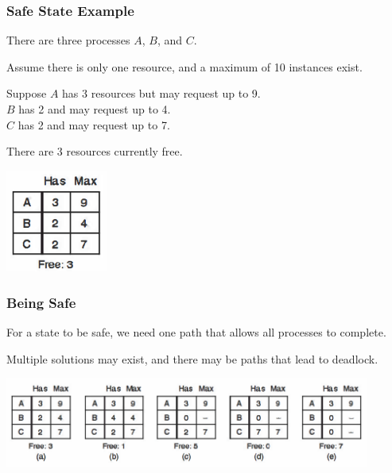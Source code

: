 \begin{frame}
\frametitle{Safe State Example}

There are three processes $A$, $B$, and $C$. 

Assume there is only one resource, and a maximum of 10 instances exist. 

Suppose $A$ has 3 resources but may request up to 9.\\
$B$ has 2 and may request up to 4.\\
$C$ has 2 and may request up to 7. 

There are 3 resources currently free.

\begin{center}
\includegraphics[width=0.25\textwidth]{images/safe-state-initial.png}
\end{center}

\end{frame}

\begin{frame}
\frametitle{Being Safe}


For a state to be safe, we need one path that allows all processes to complete. 

Multiple solutions may exist, and there may be paths that lead to deadlock. 

\begin{center}
\includegraphics[width=0.9\textwidth]{images/safe-state.png}
\end{center}


\end{frame}

